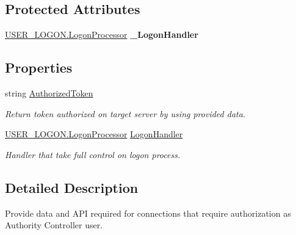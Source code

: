 \subsection*{Protected Attributes}
\begin{DoxyCompactItemize}
\item 
\mbox{\label{class_pipes_provider_1_1_networking_1_1_routing_1_1_authorized_instruction_ad4c378226e015ebdcd8390dd63d54669}} 
\mbox{\hyperlink{class_authority_controller_1_1_queries_1_1_u_s_e_r___l_o_g_o_n_1_1_logon_processor}{U\+S\+E\+R\+\_\+\+L\+O\+G\+O\+N.\+Logon\+Processor}} {\bfseries \+\_\+\+Logon\+Handler}
\end{DoxyCompactItemize}
\subsection*{Properties}
\begin{DoxyCompactItemize}
\item 
string \mbox{\hyperlink{class_pipes_provider_1_1_networking_1_1_routing_1_1_authorized_instruction_a0f856748d300d23a203b5e289007d6fd}{Authorized\+Token}}
\begin{DoxyCompactList}\small\item\em Return token authorized on target server by using provided data. \end{DoxyCompactList}\item 
\mbox{\hyperlink{class_authority_controller_1_1_queries_1_1_u_s_e_r___l_o_g_o_n_1_1_logon_processor}{U\+S\+E\+R\+\_\+\+L\+O\+G\+O\+N.\+Logon\+Processor}} \mbox{\hyperlink{class_pipes_provider_1_1_networking_1_1_routing_1_1_authorized_instruction_a9f1721ee3d1fbb3803b77a991f5e1a03}{Logon\+Handler}}
\begin{DoxyCompactList}\small\item\em Handler that take full control on logon process. \end{DoxyCompactList}\end{DoxyCompactItemize}


\subsection{Detailed Description}
Provide data and A\+PI required for connections that require authorization as Authority Controller user. 



